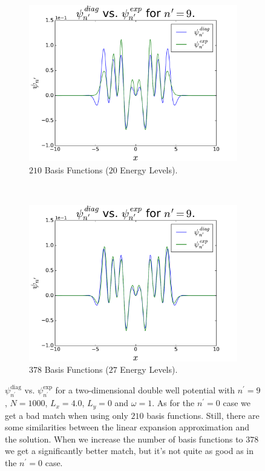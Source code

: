 \documentclass[../main.tex]{subfiles}
\begin{document}
\begin{figure}
    \centering
    \begin{subfigure}{0.5\textwidth}
        \centering
        \includegraphics[scale=0.4]{figures/psiComp_nPrime9_BF210}
        \caption{$210$ Basis Functions ($20$ Energy Levels).}
        \label{fig:nPrime9a}
    \end{subfigure}%
    ~ 
    \begin{subfigure}{0.5\textwidth}
        \centering
        \includegraphics[scale=0.4]{figures/psiComp_nPrime9_BF378}
        \caption{$378$ Basis Functions ($27$ Energy Levels).}
        \label{fig:nPrime9b}
    \end{subfigure}
    \caption{$\psi_{n^\prime}^\textrm{diag}$ vs. $\psi_{n^\prime}^\textrm{exp}$ for a two-dimensional double well potential with $n^\prime = 9$, $N=1000$, $L_x = 4.0$, $L_y = 0$ and $\omega = 1$. As for the $n^\prime = 0$ case we get a bad match when using only $210$ basis functions. Still, there are some similarities between the linear expansion approximation and the solution. When we increase the number of basis functions to $378$ we get a significantly better match, but it's not quite as good as in the $n^\prime = 0$ case.}
    \label{fig:nPrime9}
\end{figure}
\end{document}
